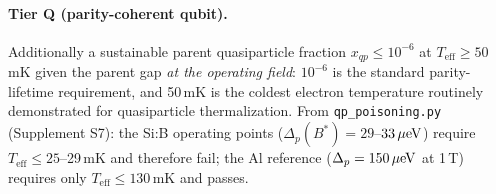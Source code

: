 \paragraph{Tier Q (parity-coherent qubit).} Additionally a sustainable
parent quasiparticle fraction $x_{qp} \le 10^{-6}$ at
$T_{\mathrm{eff}} \ge 50$\,mK given the parent gap \emph{at the operating
field}: $10^{-6}$ is the standard parity-lifetime requirement, and 50\,mK
is the coldest electron temperature routinely demonstrated for
quasiparticle thermalization. From \texttt{qp\_poisoning.py}
(Supplement S7): the Si:B operating points ($\Delta_p(B^*) = 29$--$33\,\mu\mathrm{eV}$)
require $T_{\mathrm{eff}} \le 25$--29\,mK and therefore fail; the Al
reference ($\Delta_p = 150\,\mu\mathrm{eV}$ at 1\,T) requires only
$T_{\mathrm{eff}} \le 130$\,mK and passes.


